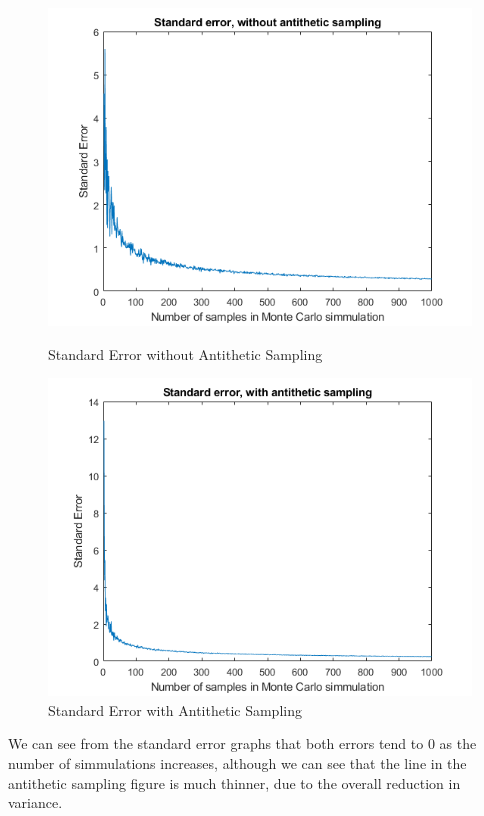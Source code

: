 \documentclass[11pt]{article}
\begin{document}
\begin{figure}[h]
    \centering
    \begin{minipage}{0.4\textwidth}
        \centering
        \includegraphics[width=1.1\textwidth]{StandardError.png}
        \caption{Standard Error without Antithetic Sampling}
    \end{minipage}
    \begin{minipage}{0.4\textwidth}
        \centering
        \includegraphics[width=1.1\textwidth]{StandardErrorAT.png}
        \caption{Standard Error with Antithetic Sampling}
    \end{minipage}
\end{figure}

We can see from the standard error graphs that both errors tend to 0 as the number of simmulations increases, 
although we can see that the line in the antithetic sampling figure is much thinner, due to the overall reduction 
in variance. \\
\end{document}
